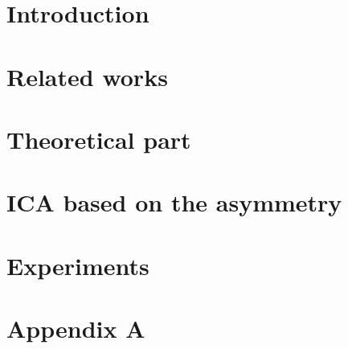 \documentclass{article}
\theoremstyle{definition}
\begin{document}
\section{Introduction}
\label{introduction}


\section{Related works}
\label{related_works}

  
 
\section{Theoretical part}
\label{sec_1}

 
%

\section{ICA based on the asymmetry}
\label{p}




\section{Experiments}
\label{experiments}


    
\section{Appendix A}
\label{a1}

\end{document}
